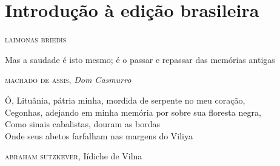 \chapter[Introdução à edição brasileira]{Introdução à edição brasileira }

\begin{flushright}
\textsc{laimonas briedis}
\end{flushright}

\epigraph{Mas a saudade é isto mesmo; é o passar e repassar das memórias
antigas}{\textsc{machado de assis}, \emph{Dom Casmurro}}

\epigraph{Ó, Lituânia, pátria minha, mordida de serpente no meu coração,\\Cegonhas, adejando em minha memória por sobre sua floresta negra,\\Como sinais cabalistas, douram as bordas\\Onde seus abetos farfalham nas margens do Viliya}{\textsc{abraham sutzkever}, Iídiche de Vilna}


